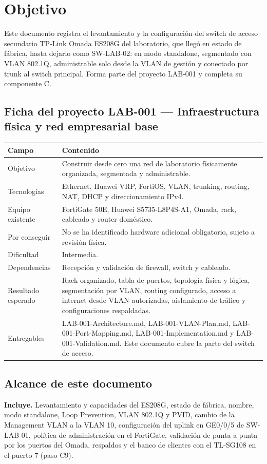 \documentclass[11pt,a4paper]{article}
\newcommand{\cab}{\rowcolor{light}}
\begin{document}
\section{Objetivo}
Este documento registra el levantamiento y la configuración del switch de acceso secundario TP-Link Omada ES208G del laboratorio, que llegó en estado de fábrica, hasta dejarlo como SW-LAB-02: en modo standalone, segmentado con VLAN 802.1Q, administrable solo desde la VLAN de gestión y conectado por trunk al switch principal. Forma parte del proyecto LAB-001 y completa su componente C.

\subsection*{Ficha del proyecto LAB-001 --- Infraestructura física y red empresarial base}
\begin{tabularx}{\textwidth}{L{3.6cm} Z}
  \toprule
  \cab\textbf{Campo} & \textbf{Contenido}\\
  \midrule
  Objetivo & Construir desde cero una red de laboratorio físicamente organizada, segmentada y administrable.\\
  Tecnologías & Ethernet, Huawei VRP, FortiOS, VLAN, trunking, routing, NAT, DHCP y direccionamiento IPv4.\\
  Equipo existente & FortiGate 50E, Huawei S5735-L8P4S-A1, Omada, rack, cableado y router doméstico.\\
  Por conseguir & No se ha identificado hardware adicional obligatorio, sujeto a revisión física.\\
  Dificultad & Intermedia.\\
  Dependencias & Recepción y validación de firewall, switch y cableado.\\
  Resultado esperado & Rack organizado, tabla de puertos, topología física y lógica, segmentación por VLAN, routing configurado, acceso a internet desde VLAN autorizadas, aislamiento de tráfico y configuraciones respaldadas.\\
  Entregables & LAB-001-Architecture.md, LAB-001-VLAN-Plan.md, LAB-001-Port-Mapping.md, LAB-001-Implementation.md y LAB-001-Validation.md. Este documento cubre la parte del switch de acceso.\\
  \bottomrule
\end{tabularx}

\subsection{Alcance de este documento}
\textbf{Incluye.} Levantamiento y capacidades del ES208G, estado de fábrica, nombre, modo standalone, Loop Prevention, VLAN 802.1Q y PVID, cambio de la Management VLAN a la VLAN 10, configuración del uplink en GE0/0/5 de SW-LAB-01, política de administración en el FortiGate, validación de punta a punta por los puertos del Omada, respaldos y el banco de clientes con el TL-SG108 en el puerto 7 (paso C9).
\end{document}
